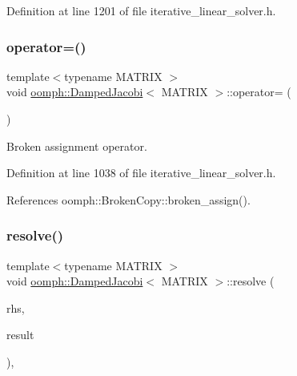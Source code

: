 Definition at line 1201 of file iterative\+\_\+linear\+\_\+solver.\+h.

\mbox{\label{classoomph_1_1DampedJacobi_a65d1f2f53c0ccaeda4a07e7dc7a79581}} 
\subsubsection{\texorpdfstring{operator=()}{operator=()}}
{\footnotesize\ttfamily template$<$typename M\+A\+T\+R\+IX $>$ \\
void \hyperlink{classoomph_1_1DampedJacobi}{oomph\+::\+Damped\+Jacobi}$<$ M\+A\+T\+R\+IX $>$\+::operator= (\begin{DoxyParamCaption}\item[{const \hyperlink{classoomph_1_1DampedJacobi}{Damped\+Jacobi}$<$ M\+A\+T\+R\+IX $>$ \&}]{ }\end{DoxyParamCaption})\hspace{0.3cm}{\ttfamily [inline]}}



Broken assignment operator. 



Definition at line 1038 of file iterative\+\_\+linear\+\_\+solver.\+h.



References oomph\+::\+Broken\+Copy\+::broken\+\_\+assign().

\mbox{\label{classoomph_1_1DampedJacobi_a571fae40f40b528e76a0636f140010e7}} 
\subsubsection{\texorpdfstring{resolve()}{resolve()}}
{\footnotesize\ttfamily template$<$typename M\+A\+T\+R\+IX $>$ \\
void \hyperlink{classoomph_1_1DampedJacobi}{oomph\+::\+Damped\+Jacobi}$<$ M\+A\+T\+R\+IX $>$\+::resolve (\begin{DoxyParamCaption}\item[{const \hyperlink{classoomph_1_1DoubleVector}{Double\+Vector} \&}]{rhs,  }\item[{\hyperlink{classoomph_1_1DoubleVector}{Double\+Vector} \&}]{result }\end{DoxyParamCaption})\hspace{0.3cm}{\ttfamily [inline]}, {\ttfamily [virtual]}}



